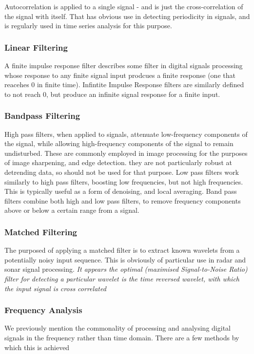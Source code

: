 \documentclass[9pt,conference]{IEEEtran}
\begin{document}
Autocorrelation is applied to a single signal - and is just the cross-correlation of the signal with itself. That has obvious use in detecting periodicity in signals, and is regularly used in time series analysis for this purpose.

\subsubsection{Linear Filtering}
A finite impulse response filter describes some filter in digital signals processing whose response to any finite signal input prodcues a finite response (one that reacehes 0 in finite time). Infintite Impulse Response filters are similarly defined to not reach 0, but produce an infinite signal response for a finite input. 
\subsubsection{Bandpass Filtering}
High pass filters, when applied to signals, attenuate low-frequency components of the signal, while allowing high-frequency components of the signal to remain undisturbed. These are commonly employed in image processing for the purposes of image sharpening, and edge detection. they are not particularly robust at detrending data, so should not be used for that purpose. Low pass filters work similarly to high pass filters, boosting low frequencies, but not high frequencies. This is typically useful as a form of denoising, and local averaging. Band pass filters combine both high and low pass filters, to remove frequency components above or below a certain range from a signal.

\subsubsection{Matched Filtering}
The purposed of applying a matched filter is to extract known wavelets from a potentially noisy input sequence. This is obviously of particular use in radar and sonar signal processing. \textit{It appears the optimal (maximised Signal-to-Noise Ratio) filter for detecting a particular wavelet is the time reversed wavelet, with which the input signal is cross correlated}

\subsubsection{Frequency Analysis}
We previously mention the commonality of processing and analysing digital signals in the frequency rather than time domain. There are a few methods by which this is achieved
\end{document}
